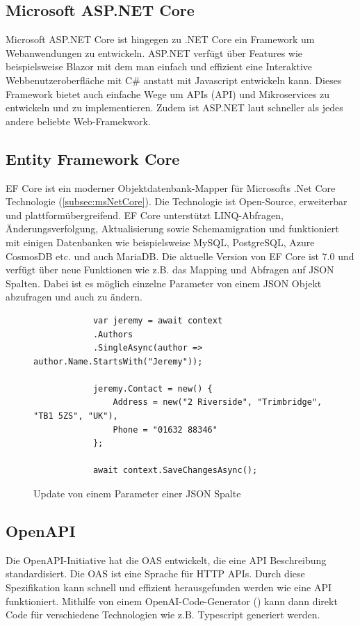 \documentclass[a4paper, fontsize=11pt, parskip=half, twoside]{scrreprt}
\begin{document}
	\textcite{billwagner_net_nodate}
	
	\subsection{Microsoft ASP.NET Core}
	Microsoft ASP.NET Core ist hingegen zu .NET Core ein Framework um Webanwendungen zu entwickeln. 
	ASP.NET verfügt über Features wie beispielsweise Blazor mit dem man einfach und effizient eine Interaktive Webbenutzeroberfläche mit C\# anstatt mit Javascript entwickeln kann.
	Dieses Framework bietet auch einfache Wege um \acl{API}s (\acs{API}) und Mikroservices zu entwickeln und zu implementieren.
	Zudem ist ASP.NET laut \textcite{noauthor_techempower_nodate} schneller als jedes andere beliebte Web-Framekwork.
	
	\textcite{billwagner_net_nodate}
	
	\subsection{Entity Framework Core}
	\ac{EF} Core ist ein moderner Objektdatenbank-Mapper für Microsofts .Net Core Technologie (\autoref{subsec:msNetCore}). 
	Die Technologie ist Open-Source, erweiterbar und plattformübergreifend.
	\ac{EF} Core unterstützt LINQ-Abfragen, Änderungsverfolgung, Aktualisierung sowie Schemamigration und funktioniert mit einigen Datenbanken wie beispielsweise MySQL, PostgreSQL, Azure CosmosDB etc. und auch MariaDB.
	Die aktuelle Version von \ac{EF} Core ist 7.0 und verfügt über neue Funktionen wie z.B. das Mapping und Abfragen auf \ac{JSON} Spalten. 
	Dabei ist es möglich einzelne Parameter von einem \ac{JSON} Objekt abzufragen und auch zu ändern.
	\newline
	\begin{figure}[ht]
		\begin{verbatim}
			var jeremy = await context
			.Authors
			.SingleAsync(author => author.Name.StartsWith("Jeremy"));
			
			jeremy.Contact = new() { 
				Address = new("2 Riverside", "Trimbridge", "TB1 5ZS", "UK"), 
				Phone = "01632 88346" 
			};
		
			await context.SaveChangesAsync();
		\end{verbatim}
		\caption{Update von einem Parameter einer \ac{JSON} Spalte}
	\end{figure}

	\textcite{billwagner_net_nodate}
	
	\subsection{OpenAPI}
	Die OpenAPI-Initiative hat die \ac{OAS} entwickelt, die eine \ac{API} Beschreibung standardisiert.
	Die \ac{OAS} ist eine Sprache für \ac{HTTP} \ac{API}s.
	Durch diese Spezifikation kann schnell und effizient herausgefunden werden wie eine \ac{API} funktioniert. 
	Mithilfe von einem OpenAI-Code-Generator (\textcite{noauthor_openapi_nodate-1}) kann dann direkt Code für verschiedene Technologien wie z.B. Typescript generiert werden.
	
\end{document}
